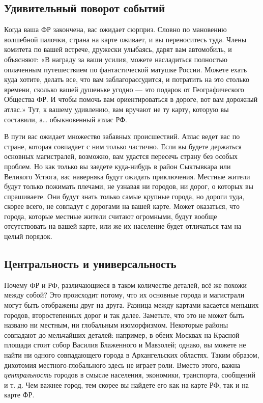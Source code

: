 \documentclass[../main.tex]{subfiles}
\begin{document}
\subsection{Удивительный поворот событий}

Когда ваша ФР закончена, вас ожидает сюрприз. Словно по мановению волшебной палочки, страна на карте оживает, и вы переноситесь туда. Члены комитета по вашей встрече, дружески улыбаясь, дарят вам автомобиль, и объясняют: «В награду за ваши усилия, можете насладиться полностью оплаченным путешествием по фантастической матушке России. Можете ехать куда хотите, делать все, что вам заблагорассудится, и потратить на это столько времени, сколько вашей душеньке угодно --- это подарок от Географического Общества ФР. И чтобы помочь вам ориентироваться в дороге, вот вам дорожный атлас.» Тут, к вашему удивлению, вам вручают не ту карту, которую вы составили, а\ldots{} обыкновенный атлас РФ.

В пути вас ожидает множество забавных происшествий. Атлас ведет вас по стране, которая совпадает с ним только частично. Если вы будете держаться основных магистралей, возможно, вам удастся пересечь страну без особых проблем. Но как только вы заедете куда-нибудь в район Сыктывкара или Великого Устюга, вас наверняка будут ожидать приключения. Местные жители будут только пожимать плечами, не узнавая ни городов, ни дорог, о которых вы спрашиваете. Они будут знать только самые крупные города, но дороги туда, скорее всего, не совпадут с дорогами на вашей карте. Может оказаться, что города, которые местные жители считают огромными, будут вообще отсутствовать на вашей карте, или же их население будет отличаться там на целый порядок.


\subsection{Центральность и универсальность}

Почему ФР и РФ, различающиеся в таком количестве деталей, всё же похожи между собой? Это происходит потому, что их основные города и магистрали могут быть отображены друг на друга. Разница между картами касается меньших городов, второстепенных дорог и так далее. Заметьте, что это не может быть названо ни местным, ни глобальным изоморфизмом. Некоторые районы совпадают до мельчайших деталей: например, в обеих Москвах на Красной площади стоит собор Василия Блаженного и Мавзолей; однако, вы можете не найти ни одного совпадающего города в Архангельских областях. Таким образом, дихотомия местного-глобального здесь не играет роли. Вместо этого, важна \emph{центральность} городов в смысле населения, экономики, транспорта, сообщений и т. д. Чем важнее город, тем скорее вы найдете его как на карте РФ, так и на карте ФР.
\end{document}

